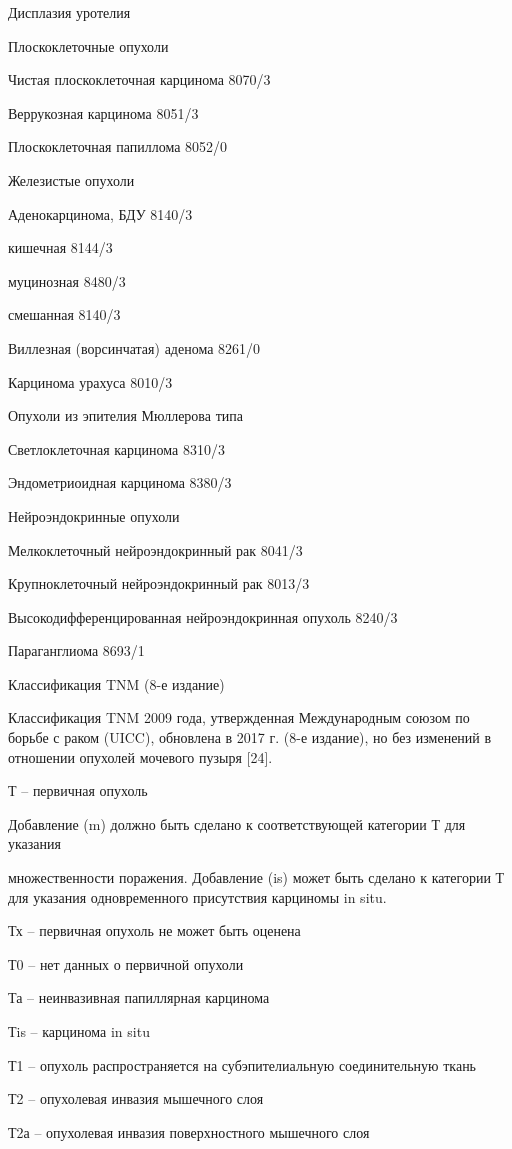 Дисплазия уротелия

Плоскоклеточные опухоли

Чистая плоскоклеточная карцинома 8070/3

Веррукозная карцинома 8051/3

Плоскоклеточная папиллома 8052/0

Железистые опухоли

Аденокарцинома, БДУ 8140/3

кишечная 8144/3

муцинозная 8480/3

смешанная 8140/3

Виллезная (ворсинчатая) аденома 8261/0

Карцинома урахуса 8010/3

Опухоли из эпителия Мюллерова типа

Светлоклеточная карцинома 8310/3

Эндометриоидная карцинома 8380/3

Нейроэндокринные опухоли

Мелкоклеточный нейроэндокринный рак 8041/3

Крупноклеточный нейроэндокринный рак 8013/3

Высокодифференцированная нейроэндокринная опухоль 8240/3

Параганглиома 8693/1

Классификация TNM (8-е издание)

Классификация TNM 2009 года, утвержденная Международным союзом по борьбе с раком (UICC), обновлена в 2017 г. (8-е издание), но без изменений в отношении опухолей мочевого пузыря [24].

Т – первичная опухоль

Добавление (m) должно быть сделано к соответствующей категории Т для указания

множественности поражения. Добавление (is) может быть сделано к категории Т для указания одновременного присутствия карциномы in situ.

Тх – первичная опухоль не может быть оценена

Т0 – нет данных о первичной опухоли

Та – неинвазивная папиллярная карцинома

Тis – карцинома in situ

Т1 – опухоль распространяется на субэпителиальную соединительную ткань

Т2 – опухолевая инвазия мышечного слоя

Т2а – опухолевая инвазия поверхностного мышечного слоя


